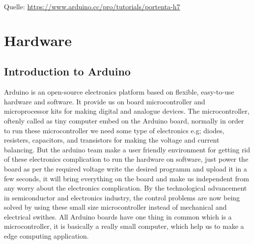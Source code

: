 {\tiny Quelle: \url{https://www.arduino.cc/pro/tutorials/portenta-h7}}


\chapter{Hardware}
\label{Hardware}
\section{Introduction to Arduino}
Arduino is an open-source electronics platform based on flexible, easy-to-use hardware and software. It provide us on board microcontroller and microprocessor kits for making digital and analogue devices. The microcontroller, oftenly called as tiny computer embed on the Arduino board, normally in order to run these microcontroller we need some type of electronics e.g; diodes, resisters, capacitors, and transistors for making the voltage and current balancing. But the arduino team make a user friendly environment for getting rid of these electronics complication to run the hardware on software, just power the board as per the required voltage write the desired programm and upload it in a few seconds, it will bring everything on the board and  make us independent from any worry about the electronics complication. By the technological advancement in semiconductor and electronics  industry, the  control problems are now being solved by using these small size microcontroller instead of mechanical and electrical swithes. All Arduino boards have one thing in common which is a microcontroller, it is basically a really small computer, which help us to make a edge computing application.%
%
